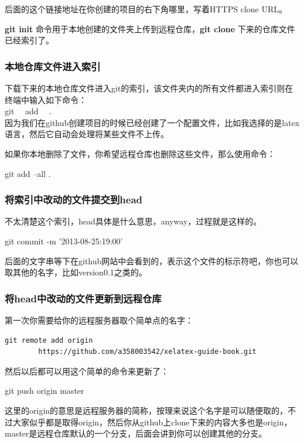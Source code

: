 \documentclass[11pt,oneside]{book}
\begin{document}
后面的这个链接地址在你创建的项目的右下角哪里，写着HTTPS clone URL。

\textbf{git init }命令用于本地创建的文件夹上传到远程仓库，\textbf{git clone }下来的仓库文件已经索引了。

\subsubsection{本地仓库文件进入索引}
下载下来的本地仓库文件进入git的索引，该文件夹内的所有文件都进入索引则在终端中输入如下命令：\\
git ~~add ~~.  \\
因为我们在github创建项目的时候已经创建了一个配置文件，比如我选择的是latex语言，然后它自动会处理将某些文件不上传。

如果你本地删除了文件，你希望远程仓库也删除这些文件，那么使用命令：
\begin{tcbbash}[]
git  add  --all   .  
\end{tcbbash}


\subsubsection{将索引中改动的文件提交到head}
不太清楚这个索引，head具体是什么意思，anyway，过程就是这样的。
\begin{tcbbash}[]
git  commit   -m  '2013-08-25:19:00' 
\end{tcbbash}
后面的文字串等下在github网站中会看到的，表示这个文件的标示符吧，你也可以取其他的名字，比如version0.1之类的。

\subsubsection{将head中改动的文件更新到远程仓库}
第一次你需要给你的远程服务器取个简单点的名字：
\begin{Verbatim}
git remote add origin 
        https://github.com/a358003542/xelatex-guide-book.git
\end{Verbatim}


然后以后都可以用这个简单的命令来更新了：
\begin{tcbbash}[]
git  push  origin  master
\end{tcbbash}

这里的origin的意思是远程服务器的简称，按理来说这个名字是可以随便取的，不过大家似乎都是取得origin，然后你从github上clone下来的内容大多也是origin，master是远程仓库默认的一个分支，后面会讲到你可以创建其他的分支。
\end{document}
